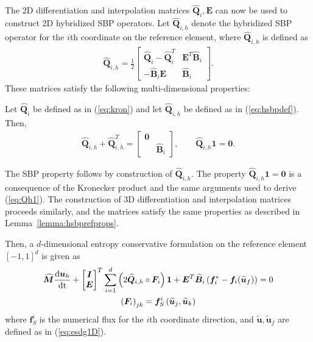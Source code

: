 \documentclass{svjour3}                     %
\renewcommand{\hat}{\widehat}
\renewcommand{\tilde}{\widetilde}
\newcommand{\td}[2]{\frac{{\rm d}#1}{{\rm d}{\rm #2}}}
\newcommand{\LRp}[1]{\left( #1 \right)}
\begin{document}
The 2D differentiation and interpolation matrices $\hat{\bm{Q}}_i, \bm{E}$ can now be used to construct 2D hybridized SBP operators.  Let $\hat{\bm{Q}}_{i,h}$ denote the hybridized SBP operator for the $i$th coordinate on the reference element, where $\hat{\bm{Q}}_{i,h}$ is defined as
\begin{align}
\hat{\bm{Q}}_{i,h} = \frac{1}{2}\begin{bmatrix}
\hat{\bm{Q}}_i - \hat{\bm{Q}}_i^T & \bm{E}^T\hat{\bm{B}}_i\\
-\hat{\bm{B}}_i\bm{E} & \hat{\bm{B}}_i
\end{bmatrix}.
\label{eq:hsbpdef}
\end{align}
These matrices satisfy the following multi-dimensional properties:
\begin{lemma}
\label{lemma:hsbprefprops}
Let $\hat{\bm{Q}}_{i}$ be defined as in (\ref{eq:kron}) and let $\hat{\bm{Q}}_{i,h}$ be defined as in (\ref{eq:hsbpdef}).  Then, 
\begin{align}
\hat{\bm{Q}}_{i,h} + \hat{\bm{Q}}_{i,h}^T = \begin{bmatrix}
\bm{0} & \\
& \hat{\bm{B}}_i
\end{bmatrix}, \qquad \hat{\bm{Q}}_{i,h}\bm{1} = \bm{0}.
\end{align}
\end{lemma}
The SBP property follows by construction of $\hat{\bm{Q}}_{i,h}$.  The property $\hat{\bm{Q}}_{i,h}\bm{1} = \bm{0}$ is a consequence of the Kronecker product and the same arguments used to derive (\ref{eq:Qh1}).  The construction of 3D differentiation and interpolation matrices proceeds similarly, and the matrices satisfy the same properties as described in Lemma~\ref{lemma:hsbprefprops}.  

Then, a $d$-dimensional entropy conservative formulation on the reference element $[-1,1]^d$ is given as 
\begin{gather}
\hat{\bm{M}}\td{\bm{u}_h}{t} + \begin{bmatrix} \bm{I} \\ \bm{E} \end{bmatrix}^T
\sum_{i=1}^d \LRp{2\hat{\bm{Q}}_{i,h} \circ \bm{F}_i}\bm{1} + \bm{E}^T\hat{\bm{B}}_i\LRp{\bm{f}_i^*-\bm{f}_i(\tilde{\bm{u}}_f)} = 0 \label{eq:esdgref}\\
\LRp{\bm{F}_i}_{jk} = \bm{f}^i_S\LRp{\tilde{\bm{u}}_j,\tilde{\bm{u}}_k}
\end{gather}
where $\bm{f}^i_S$ is the numerical flux for the $i$th coordinate direction, and $\tilde{\bm{u}},\tilde{\bm{u}}_f$ are defined as in (\ref{eq:esdg1D}).  
\end{document}
